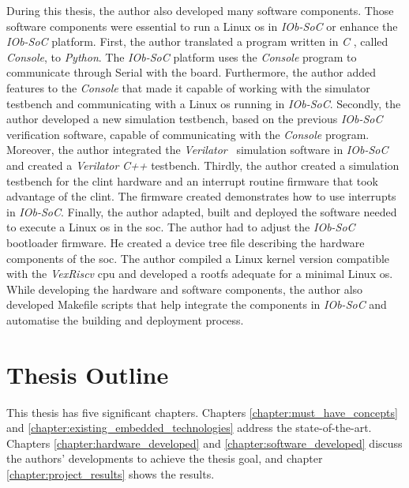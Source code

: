 During this thesis, the author also developed many software components. Those software components were essential to run a Linux \acrshort{os} in \textit{IOb-SoC} or enhance the \textit{IOb-SoC} platform. First, the author translated a program written in \textit{C} , called \textit{Console}, to \textit{Python}. The \textit{IOb-SoC} platform uses the \textit{Console} program to communicate through Serial with the board. Furthermore, the author added features to the \textit{Console} that made it capable of working with the simulator testbench and communicating with a Linux \acrshort{os} running in \textit{IOb-SoC}. Secondly, the author developed a new simulation testbench, based on the previous \textit{IOb-SoC} verification software, capable of communicating with the \textit{Console} program. Moreover, the author integrated the \textit{Verilator}~\cite{snyder2010verilator} simulation software in \textit{IOb-SoC} and created a \textit{Verilator} \textit{C++} testbench. Thirdly, the author created a simulation testbench for the \acrshort{clint} hardware and an interrupt routine firmware that took advantage of the \acrshort{clint}. The firmware created demonstrates how to use interrupts in \textit{IOb-SoC}. Finally, the author adapted, built and deployed the software needed to execute a Linux \acrshort{os} in the \acrshort{soc}. The author had to adjust the \textit{IOb-SoC} bootloader firmware. He created a device tree file describing the hardware components of the \acrshort{soc}. The author compiled a Linux kernel version compatible with the \textit{VexRiscv} \acrshort{cpu} and developed a \acrlong{rootfs} adequate for a minimal Linux \acrshort{os}. While developing the hardware and software components, the author also developed Makefile scripts that help integrate the components in \textit{IOb-SoC} and automatise the building and deployment process.

\section{Thesis Outline}
\label{section:thesis_outline}
This thesis has five significant chapters. Chapters \ref{chapter:must_have_concepts} and \ref{chapter:existing_embedded_technologies} address the state-of-the-art. Chapters \ref{chapter:hardware_developed} and \ref{chapter:software_developed} discuss the authors' developments to achieve the thesis goal, and chapter \ref{chapter:project_results} shows the results. 

